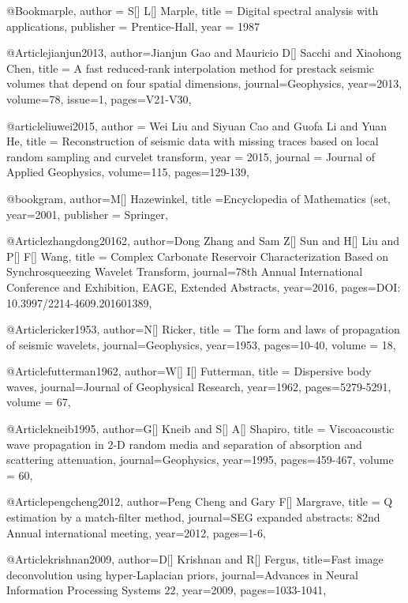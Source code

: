 {@Book{marple,
  author = 	 {S[] L[] Marple},
  title = 	 {Digital spectral analysis with applications},
  publisher = 	 {Prentice-Hall},
  year = 	 1987}
  
@Article{jianjun2013,
  author={Jianjun Gao and Mauricio D[] Sacchi and Xiaohong Chen},
  title = {A fast reduced-rank interpolation method for prestack seismic volumes that depend on four spatial dimensions},
  journal={Geophysics},
  year=2013,
  volume=78,
    issue=1,
  pages={V21-V30},
}

@article{liuwei2015,
  author =	 {Wei Liu and Siyuan Cao and Guofa Li and Yuan He},
  title =	 {Reconstruction of seismic data with missing traces based on local random sampling and curvelet transform},
  year =	 2015,
  journal =	 {Journal of Applied Geophysics},
  volume={115},
 pages=129-139,
}

@book{gram,
  author={M[] Hazewinkel},
  title ={Encyclopedia of Mathematics (set},
  year=2001,
  publisher = {Springer},
}


@Article{zhangdong20162,
  author={Dong Zhang and Sam Z[] Sun and H[] Liu and P[] F[] Wang},
  title = {Complex Carbonate Reservoir Characterization Based on Synchrosqueezing Wavelet Transform},
  journal={78th Annual International Conference and Exhibition, EAGE, Extended Abstracts},
  year=2016,
  pages={DOI: 10.3997/2214-4609.201601389},
}






@Article{ricker1953,
  author={N[] Ricker},
  title = {The form and laws of propagation of seismic wavelets},
  journal={Geophysics},
  year=1953,
  pages={10-40},
  volume = 18,
}

@Article{futterman1962,
  author={W[] I[] Futterman},
  title = {Dispersive body waves},
  journal={Journal of Geophysical Research},
  year=1962,
  pages={5279-5291},
  volume = 67,
}

@Article{kneib1995,
  author={G[] Kneib and S[] A[] Shapiro},
  title = {Viscoacoustic wave propagation in 2-D random media and separation of absorption and scattering attenuation},
  journal={Geophysics},
  year=1995,
  pages={459-467},
  volume = 60,
}

@Article{pengcheng2012,
  author={Peng Cheng and Gary F[] Margrave},
  title = {Q estimation by a match-filter method},
  journal={SEG expanded abstracts: 82nd Annual international meeting},
  year=2012,
  pages={1-6},
}

@Article{krishnan2009,
  author={D[] Krishnan and R[] Fergus},
  title={Fast image deconvolution using hyper-Laplacian priors},
  journal={Advances in Neural Information Processing Systems 22},
  year=2009,
  pages={1033-1041},
}

}
